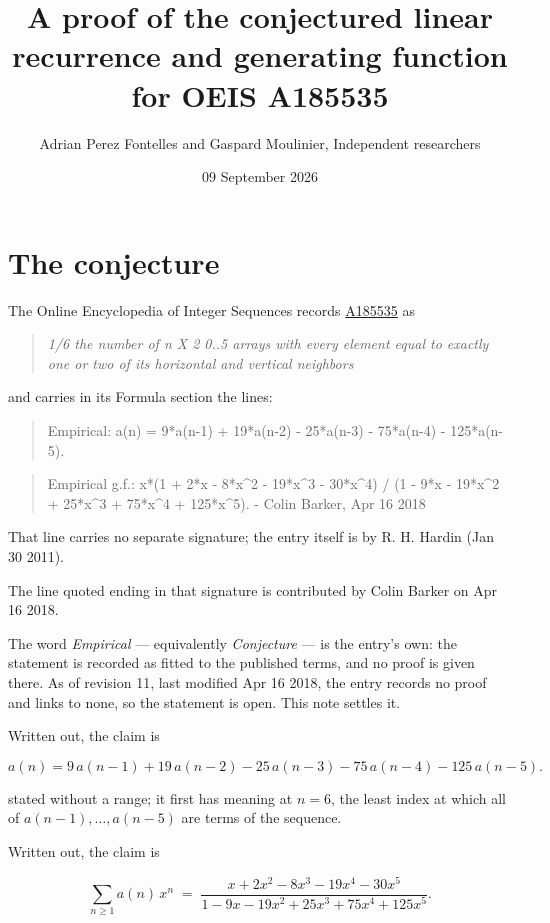 \documentclass[11pt]{article}
\title{A proof of the conjectured linear recurrence and generating function for OEIS A185535}
\author{Adrian Perez Fontelles and Gaspard Moulinier, Independent researchers}
\date{09 September 2026}
\theoremstyle{definition}
\begin{document}
\maketitle
\section{The conjecture}

The Online Encyclopedia of Integer Sequences records \href{https://oeis.org/A185535}{A185535} as

\begin{quote}\itshape 1/6 the number of n X 2 0..5 arrays with every element equal to exactly one or two of its horizontal and vertical neighbors\end{quote}

and carries in its Formula section the lines:

\begin{quote}\ttfamily Empirical: a(n) = 9*a(n-1) + 19*a(n-2) - 25*a(n-3) - 75*a(n-4) - 125*a(n-5).\end{quote}

\begin{quote}\ttfamily Empirical g.f.: x*(1 + 2*x - 8*x\textasciicircum{}2 - 19*x\textasciicircum{}3 - 30*x\textasciicircum{}4) / (1 - 9*x - 19*x\textasciicircum{}2 + 25*x\textasciicircum{}3 + 75*x\textasciicircum{}4 + 125*x\textasciicircum{}5). - Colin Barker, Apr 16 2018\end{quote}

That line carries no separate signature; the entry itself is by R. H. Hardin (Jan 30 2011).

The line quoted ending in that signature is contributed by Colin Barker on Apr 16 2018.

The word {\itshape Empirical} --- equivalently {\itshape Conjecture} --- is the entry's own: the statement is recorded as fitted to the published terms, and no proof is given there. As of revision 11, last modified Apr 16 2018, the entry records no proof and links to none, so the statement is open. This note settles it.

Written out, the claim is

\[a(n) = 9\,a(n-1) + 19\,a(n-2) - 25\,a(n-3) - 75\,a(n-4) - 125\,a(n-5).\]

stated without a range; it first has meaning at $n = 6$, the least index at which all of $a(n-1),\dots,a(n-5)$ are terms of the sequence.

Written out, the claim is

\[\sum_{n \ge 1} a(n)\,x^n \;=\; \frac{x + 2x^{2} - 8x^{3} - 19x^{4} - 30x^{5}}{1 - 9x - 19x^{2} + 25x^{3} + 75x^{4} + 125x^{5}}.\]
\end{document}
